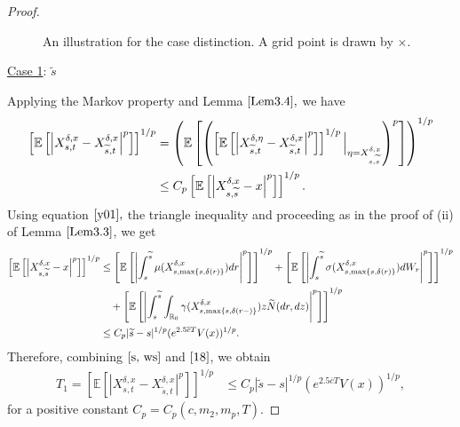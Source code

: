 \documentclass[11pt]{article}
\theoremstyle{theorem}
\theoremstyle{definition}
\newcommand{\bR}{\mathbb{R}}
\newcommand{\1}{{\bf 1}}
\begin{document}
\begin{proof}
\begin{figure}[ht]
\caption{An illustration for the case distinction. A grid point is drawn by $\times$.}
\end{figure}

\noindent\underline{Case 1}: $\widetilde{s}$ 

Applying the Markov property and Lemma $\ref{Lem3.4},$ we have
\begin{align}
    \label{s, ws}  \left[\mathbb{E}\left[\left|X^{\delta, x}_{s,t}-X^{\delta, x}_{\widetilde{s},t}\right|^p\right]\right]^{1/p} &= \left(\mathbb{E} \left[ \left(\left[\mathbb{E}\left[\left|X^{\delta,\eta}_{\widetilde{s},t}-X^{\delta, x}_{\widetilde{s},t}\right|^p\right]\right]^{1/p}\Big | _{\eta = X^{\delta, x}_{s,\widetilde{s}} }\right)^p\right] \right)^{1/p} \notag \\
    & \leq C_p \left[\mathbb{E}\left[\left|X^{\delta, x}_{s,\widetilde{s}}-x \right|^p\right]\right]^{1/p}.  \end{align}
Using equation $\eqref{y01},$ the triangle inequality and proceeding as in the proof of (ii) of Lemma $\ref{Lem3.3}$, we get
\begin{align}
\label{18}
\left[\mathbb{E}\left[\left|X^{\delta, x}_{s,\widetilde{s}}-x \right|^p\right]\right]^{1/p} 
 &\leq \left[\mathbb{E} \left[\left| \int_s^{\widetilde{s}} \mu(X_{s,\max\{s,\delta(r)\}}^{\delta,x}) dr \right|^p \right]\right]^{1/p} + \left[\mathbb{E} \left[\left| \int_s^{\widetilde{s}} \sigma(X_{s,\max\{s,\delta(r)\}}^{\delta,x}) dW_r \right|^p \right]\right]^{1/p} \notag \\
& \quad  + \left[\mathbb{E} \left[\left| \int_s^{\widetilde{s}} \int _{\bR_0}\gamma (X_{s,\max\{s,\delta(r-)\}}^{\delta,x}) z \widetilde{N}(dr, dz) \right|^p\right]\right]^{1/p} \notag \\
&  \leq  C_p |\widetilde{s} -s|^{1/p} (e^{2.5\overline{c}T}V(x))^{1/p}. \end{align}
Therefore, combining $\eqref{s, ws}$ and $\eqref{18}$, we obtain
    \begin{align}
T_1 = \left[\mathbb{E}\left[\left|X^{\delta, x}_{s,t}-X^{\delta, x}_{\widetilde{s},t}\right|^p\right]\right]^{1/p} &\leq C_p |\widetilde{s} -s|^{1/p} (e^{2.5\overline{c}T}V(x))^{1/p},
\label{cA2}
\end{align}
for a positive constant $C_p=C_p(c, m_2, m_p, T).$ 


\end{proof}
\end{document}
